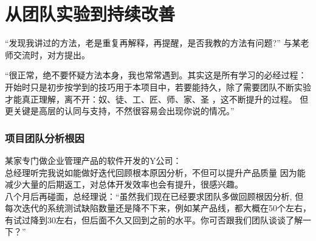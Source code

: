 \chapter{从团队实验到持续改善} %

``发现我讲过的方法，老是重复再解释，再提醒，是否我教的方法有问题?''
与某老师交流时，对方提出。

``很正常，绝不要怀疑方法本身，我也常常遇到。其实这是所有学习的必经过程：开始时只是初步按学到的技巧用于本项目中，若要能持久，除了需要团队不断实验才能真正理解，离不开：奴、徒、工、匠、师、家、圣
，这不断提升的过程。
但更关键是高层的认同与支持，不然很容易会出现你说的情况。''

\hypertarget{ux9879ux76eeux56e2ux961fux5206ux6790ux6839ux56e0}{%
\subsection{项目团队分析根因}\label{ux9879ux76eeux56e2ux961fux5206ux6790ux6839ux56e0}}

某家专门做企业管理产品的软件开发的Y公司：\\
总经理听完我说如能做好迭代回顾根本原因分析，不但可以提升产品质量
因为能减少大量的后期返工，对总体开发效率也会有提升，很感兴趣。\\
八个月后再碰面，总经理说：``虽然我们现在已经要求团队多做回顾根因分析,
但每次迭代的系统测试缺陷数量还是降不下来，例如某产品线，都大概在50个左右，有试过降到30左右，但后面不久又回到之前的水平。你可否跟我们团队谈谈了解一下？''


